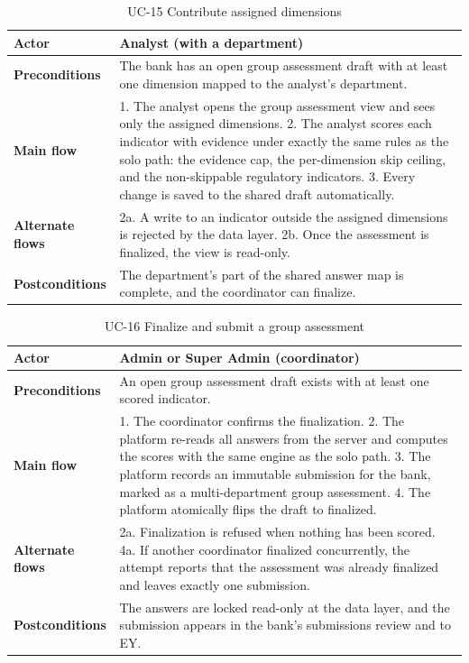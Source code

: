 \begin{table}[H]
\centering
\caption{UC-15 Contribute assigned dimensions}
\label{tab:uc15}
\begin{tabular}{|p{3cm}|p{12cm}|}
\hline
\textbf{Actor} & Analyst (with a department) \\
\hline
\textbf{Preconditions} & The bank has an open group assessment draft with at least one dimension mapped to the analyst's department. \\
\hline
\textbf{Main flow} & 1. The analyst opens the group assessment view and sees only the assigned dimensions. 2. The analyst scores each indicator with evidence under exactly the same rules as the solo path: the evidence cap, the per-dimension skip ceiling, and the non-skippable regulatory indicators. 3. Every change is saved to the shared draft automatically. \\
\hline
\textbf{Alternate flows} & 2a. A write to an indicator outside the assigned dimensions is rejected by the data layer. 2b. Once the assessment is finalized, the view is read-only. \\
\hline
\textbf{Postconditions} & The department's part of the shared answer map is complete, and the coordinator can finalize. \\
\hline
\end{tabular}
\end{table}

\begin{table}[H]
\centering
\caption{UC-16 Finalize and submit a group assessment}
\label{tab:uc16}
\begin{tabular}{|p{3cm}|p{12cm}|}
\hline
\textbf{Actor} & Admin or Super Admin (coordinator) \\
\hline
\textbf{Preconditions} & An open group assessment draft exists with at least one scored indicator. \\
\hline
\textbf{Main flow} & 1. The coordinator confirms the finalization. 2. The platform re-reads all answers from the server and computes the scores with the same engine as the solo path. 3. The platform records an immutable submission for the bank, marked as a multi-department group assessment. 4. The platform atomically flips the draft to finalized. \\
\hline
\textbf{Alternate flows} & 2a. Finalization is refused when nothing has been scored. 4a. If another coordinator finalized concurrently, the attempt reports that the assessment was already finalized and leaves exactly one submission. \\
\hline
\textbf{Postconditions} & The answers are locked read-only at the data layer, and the submission appears in the bank's submissions review and to EY. \\
\hline
\end{tabular}
\end{table}

